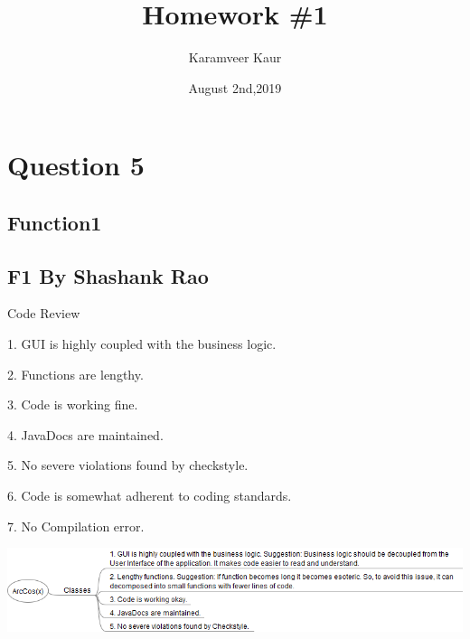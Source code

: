 \documentclass[
	12pt, %
]{fphw}
\title{Homework \#1} %
\author{Karamveer Kaur} %
\date{August 2nd,2019} %
\institute{University of Concordia \\ Department of software engineering} %
\begin{document}
\maketitle %


\section*{Question 5}
\subsection*{Function1}
\subsection*{F1 By Shashank Rao}





\begin{problem}
  Code Review
\end{problem}

\item 1. GUI is highly coupled with the business logic.
\item 2. Functions are lengthy.
\item 3. Code is working fine.
\item 4. JavaDocs are maintained.
\item 5. No severe violations found by checkstyle.
\item 6. Code is somewhat adherent to coding standards.
\item 7. No Compilation error.
\begin{center} \includegraphics[width=0.5\columnwidth]{CodeReview.png} %
\end{center}
\end{document}
